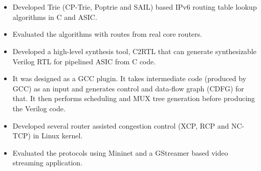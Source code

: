 \documentclass[10pt,a4paper,ragged2e]{altacv}
\begin{document}
\\
\\







\begin{itemize}
	\item Developed Trie (CP-Trie, Poptrie and SAIL) based IPv6 routing table lookup algorithms in C and ASIC. 
	\item Evaluated the algorithms with routes from real core routers.
\end{itemize}
\smallskip
{}
\begin{itemize}
	\item Developed a high-level synthesis tool, C2RTL that can generate synthesizable Verilog RTL for pipelined ASIC from C code.
	\item It was designed as a GCC plugin. It takes intermediate code (produced by GCC) as an input and generates control and data-flow graph (CDFG) for that. It then performs scheduling and MUX tree generation before producing the Verilog code. 
\end{itemize}
\smallskip
{}
\begin{itemize}
	\item Developed several router assisted congestion control (XCP, RCP and NC-TCP)  in Linux kernel.
	\item Evaluated the protocols using Mininet and a GStreamer based video streaming application. 
\end{itemize}
\end{document}
